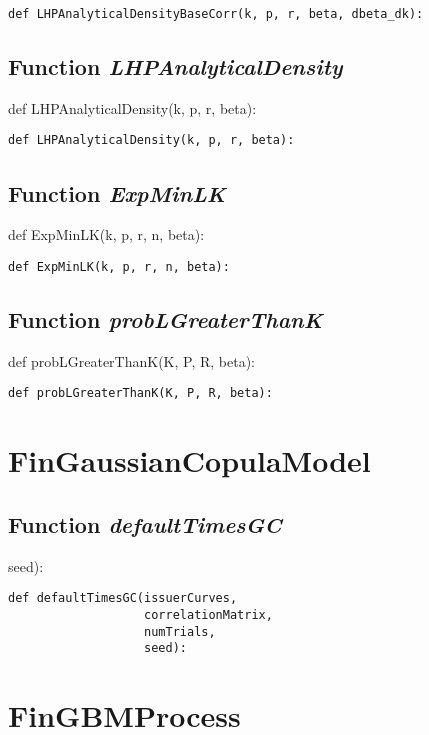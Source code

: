 \documentclass[twoside,11pt]{book}
\begin{document}
\begin{lstlisting}
def LHPAnalyticalDensityBaseCorr(k, p, r, beta, dbeta_dk):
\end{lstlisting}

\subsection{Function {\it LHPAnalyticalDensity}}
def LHPAnalyticalDensity(k, p, r, beta):

\begin{lstlisting}
def LHPAnalyticalDensity(k, p, r, beta):
\end{lstlisting}

\subsection{Function {\it ExpMinLK}}
def ExpMinLK(k, p, r, n, beta):

\begin{lstlisting}
def ExpMinLK(k, p, r, n, beta):
\end{lstlisting}

\subsection{Function {\it probLGreaterThanK}}
def probLGreaterThanK(K, P, R, beta):

\begin{lstlisting}
def probLGreaterThanK(K, P, R, beta):
\end{lstlisting}

\newpage
\section{FinGaussianCopulaModel}

\subsection{Function {\it defaultTimesGC}}
seed):

\begin{lstlisting}
def defaultTimesGC(issuerCurves,
                   correlationMatrix,
                   numTrials,
                   seed):
\end{lstlisting}

\newpage
\section{FinGBMProcess}
\end{document}

